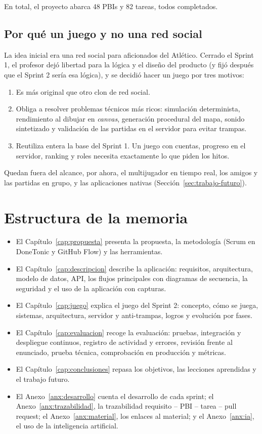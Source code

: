 En total, el proyecto abarca 48 PBIs y 82 tareas, todos completados.

\subsection{Por qué un juego y no una red social}

La idea inicial era una red social para aficionados del Atlético. Cerrado el Sprint 1, el profesor dejó libertad para la lógica y el diseño del producto (y fijó después que el Sprint 2 sería esa lógica), y se decidió hacer un juego por tres motivos:

\begin{enumerate}
    \item Es más original que otro clon de red social.
    \item Obliga a resolver problemas técnicos más ricos: simulación determinista, rendimiento al dibujar en \textit{canvas}, generación procedural del mapa, sonido sintetizado y validación de las partidas en el servidor para evitar trampas.
    \item Reutiliza entera la base del Sprint 1. Un juego con cuentas, progreso en el servidor, ranking y roles necesita exactamente lo que piden los hitos.
\end{enumerate}

Quedan fuera del alcance, por ahora, el multijugador en tiempo real, los amigos y las partidas en grupo, y las aplicaciones nativas (Sección~\ref{sec:trabajo-futuro}).

\section{Estructura de la memoria}

\begin{itemize}
    \item El Capítulo~\ref{cap:propuesta} presenta la propuesta, la metodología (Scrum en DoneTonic y GitHub Flow) y las herramientas.
    \item El Capítulo~\ref{cap:descripcion} describe la aplicación: requisitos, arquitectura, modelo de datos, API, los flujos principales con diagramas de secuencia, la seguridad y el uso de la aplicación con capturas.
    \item El Capítulo~\ref{cap:juego} explica el juego del Sprint 2: concepto, cómo se juega, sistemas, arquitectura, servidor y anti-trampas, logros y evolución por fases.
    \item El Capítulo~\ref{cap:evaluacion} recoge la evaluación: pruebas, integración y despliegue continuos, registro de actividad y errores, revisión frente al enunciado, prueba técnica, comprobación en producción y métricas.
    \item El Capítulo~\ref{cap:conclusiones} repasa los objetivos, las lecciones aprendidas y el trabajo futuro.
    \item El Anexo~\ref{anx:desarrollo} cuenta el desarrollo de cada sprint; el Anexo~\ref{anx:trazabilidad}, la trazabilidad requisito -- PBI -- tarea -- pull request; el Anexo~\ref{anx:material}, los enlaces al material; y el Anexo~\ref{anx:ia}, el uso de la inteligencia artificial.
\end{itemize}
